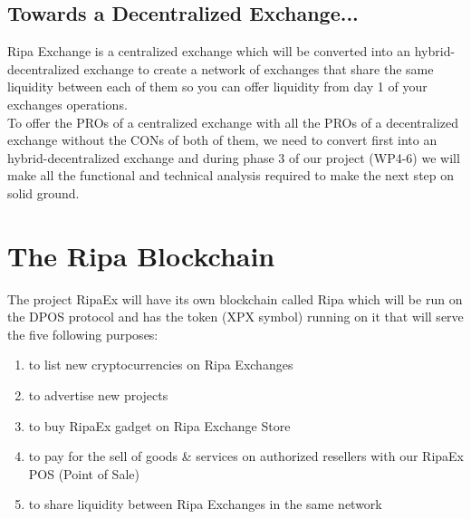 \documentclass[11pt,fleqn,oneside]{book} %
\begin{document}
\section{Towards a Decentralized Exchange...}
Ripa Exchange is a centralized exchange which will be converted into an hybrid-decentralized exchange to create a network of exchanges
that share the same liquidity between each of them so you can offer liquidity from day 1 of your exchanges operations.\\

To offer the PROs of a centralized exchange with all the PROs of a decentralized exchange without the CONs of both of them, 
we need to convert first into an hybrid-decentralized exchange and during phase 3 of our project (WP4-6) we will make all the 
functional and technical analysis required to make the next step on solid ground.




\chapter{The Ripa Blockchain}
The project RipaEx will have its own blockchain called Ripa which will be run on the DPOS protocol and has the \PHP 
token (XPX symbol) running on it that will serve the five following purposes:
	\begin{enumerate}
		\item to list new cryptocurrencies on Ripa Exchanges
		\item to advertise new projects
		\item to buy RipaEx gadget on Ripa Exchange Store
		\item to pay for the sell of goods \& services on authorized resellers with our RipaEx POS (Point of Sale)
		\item to share liquidity between Ripa Exchanges in the same network
	\end{enumerate}
\end{document}
